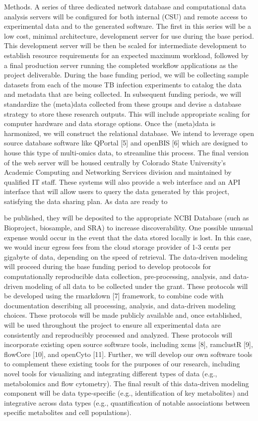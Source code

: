 \documentclass[]{book}
\begin{document}
Methods. A series of three dedicated network database and computational
data analysis servers will be configured for both internal (CSU) and
remote access to experimental data and to the generated software. The
first in this series will be a low cost, minimal architecture,
development server for use during the base period. This development
server will be then be scaled for intermediate development to establish
resource requirements for an expected maximum workload, followed by a
final production server running the completed workflow applications as
the project deliverable. During the base funding period, we will be
collecting sample datasets from each of the mouse TB infection
experiments to catalog the data and metadata that are being collected.
In subsequent funding periods, we will standardize the (meta)data
collected from these groups and devise a database strategy to store
these research outputs. This will include appropriate scaling for
computer hardware and data storage options. Once the (meta)data is
harmonized, we will construct the relational database. We intend to
leverage open source database software like QPortal {[}5{]} and openBIS
{[}6{]} which are designed to house this type of multi-omics data, to
streamline this process. The final version of the web server will be
housed centrally by Colorado State University's Academic Computing and
Networking Services division and maintained by qualified IT staff. These
systems will also provide a web interface and an API interface that will
allow users to query the data generated by this project, satisfying the
data sharing plan. As data are ready to

be published, they will be deposited to the appropriate NCBI Database
(such as Bioproject, biosample, and SRA) to increase discoverability.
One possible unusual expense would occur in the event that the data
stored locally is lost. In this case, we would incur egress fees from
the cloud storage provider of 1-3 cents per gigabyte of data, depending
on the speed of retrieval. The data-driven modeling will proceed during
the base funding period to develop protocols for computationally
reproducible data collection, pre-processing, analysis, and data-driven
modeling of all data to be collected under the grant. These protocols
will be developed using the rmarkdown {[}7{]} framework, to combine code
with documentation describing all processing, analysis, and data-driven
modeling choices. These protocols will be made publicly available and,
once established, will be used throughout the project to ensure all
experimental data are consistently and reproducibly processed and
analyzed. These protocols will incorporate existing open source software
tools, including xcms {[}8{]}, ramclustR {[}9{]}, flowCore {[}10{]}, and
openCyto {[}11{]}. Further, we will develop our own software tools to
complement these existing tools for the purposes of our research,
including novel tools for visualizing and integrating different types of
data (e.g., metabolomics and flow cytometry). The final result of this
data-driven modeling component will be data type-specific (e.g.,
identification of key metabolites) and integrative across data types
(e.g., quantification of notable associations between specific
metabolites and cell populations).
\end{document}
